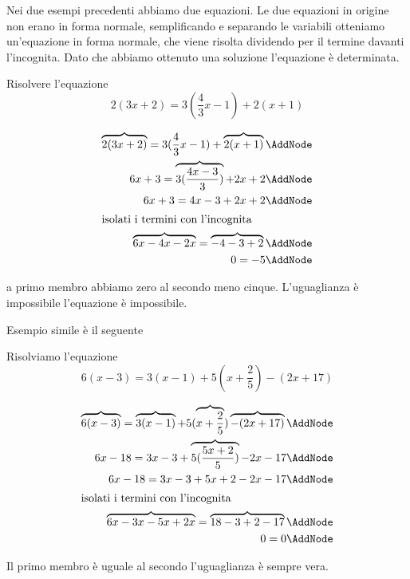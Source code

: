 Nei due esempi precedenti abbiamo due equazioni. Le due equazioni in origine non erano in forma normale, semplificando e separando le variabili otteniamo un'equazione in forma normale,  che viene risolta dividendo per il termine davanti l'incognita. Dato che abbiamo ottenuto una soluzione l'equazione è determinata.
\begin{esempio}
Risolvere l'equazione \[2(3x+2)=3(\dfrac{4}{3}x-1)+2(x+1) \]
 \begin{NodesList}[margin=3cm]
  \begin{align*}
\overbrace{2(3x+2)}=3(\dfrac{4}{3}x-1)+\overbrace{2(x+1)} \AddNode\\
6x+3=\overbrace{3(\dfrac{4x-3}{3})}+2x+2 \AddNode\\
 6x+3=4x-3+2x+2  \AddNode\\
  \intertext{\hfil isolati i termini con l'incognita \hfil}
 \overbrace{6x-4x-2x}=\overbrace{-4-3+2}  \AddNode\\
 0=-5\AddNode
  \end{align*}
  \end{NodesList}
  a  primo membro abbiamo zero al secondo meno cinque. L'uguaglianza è impossibile l'equazione è impossibile.
\end{esempio}
Esempio simile è il seguente
\begin{esempio}
Risolviamo l'equazione \[ 6(x-3) = 3(x-1)+5(x+\dfrac{2}{5})-(2x+17)\]
\begin{NodesList}[margin=3cm]
  \begin{align*}
\overbrace{6(x-3)} = \overbrace{3(x-1)}+5(\overbrace{x+\dfrac{2}{5}})\overbrace{-(2x+17)} \AddNode\\
6x-18 = 3x-3+\overbrace{5(\dfrac{5x+2}{5})}-2x-17\AddNode\\
6x-18 = 3x-3+5x+2-2x-17  \AddNode\\
  \intertext{\hfil isolati i termini con l'incognita \hfil}
 \overbrace{6x-3x-5x+2x}=\overbrace{18-3+2-17}  \AddNode\\
 0=0\AddNode
  \end{align*}
  \end{NodesList}
  Il primo membro è uguale al secondo l'uguaglianza è sempre vera. 
\end{esempio}
